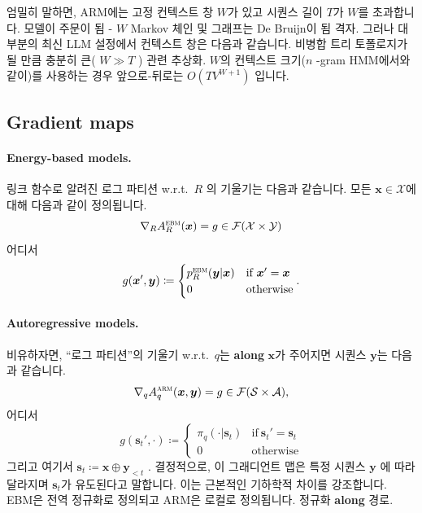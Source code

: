 \documentclass{article}
\def\s{{\bm{s}}}
\def\x{{\bm{x}}}
\def\y{{\bm{y}}}
\def\cA{{\mathcal{A}}}
\def\cF{{\mathcal{F}}}
\def\cS{{\mathcal{S}}}
\def\cX{{\mathcal{X}}}
\def\cY{{\mathcal{Y}}}
\def\arm{{\textsc{arm}}}
\def\ebm{{\textsc{ebm}}}
\def\wrt{{w.r.t.\ }}
\begin{document}
엄밀히 말하면,
ARM에는 고정 컨텍스트 창 $W$가 있고 시퀀스 길이 $T$가 $W$를 초과합니다.
모델이 주문이 됨 - $W$ Markov 체인 및 그래프는 De Bruijn이 됨
격자. 그러나 대부분의 최신 LLM 설정에서 컨텍스트 창은 다음과 같습니다.
비병합 트리 토폴로지가 될 만큼 충분히 큰( $W \gg T$ )
관련 추상화. 
$W$의 컨텍스트 크기($n$ -gram HMM에서와 같이)를 사용하는 경우
앞으로-뒤로는 $O(T V^{W+1})$ 입니다.

\subsection{Gradient maps} 
 \label{sec:gradient_maps}

\paragraph{Energy-based models.}

링크 함수로 알려진 로그 파티션 \wrt $R$ 의 기울기는 다음과 같습니다.
모든 $\x \in \cX$에 대해 다음과 같이 정의됩니다.
 \begin{equation} 
 \nabla _R A^ \ebm _R( \x ) = g \in \cF ( \cX \times \cY )
 \end{equation} 
어디서
 \begin{equation} 
g( \x ', \y ) \coloneqq 
 \begin{cases} 
    p^ \ebm _R( \y | \x ) & \text{if} \ \x ' = \x \\
    0 & \text{otherwise} 
 \end{cases} .
 \end{equation}

\paragraph{Autoregressive models.}

비유하자면, ``로그 파티션''의 기울기 \wrt $q$는 
 \textbf{along} $\x$가 주어지면 시퀀스 $\y$는 다음과 같습니다.
 \begin{equation} 
 \nabla _q A^ \arm _q( \x , \y ) = g \in \cF ( \cS \times \cA ),
 \end{equation} 
어디서
 \begin{equation} 
g( \s _t', \cdot ) \coloneqq \begin{cases} 
     \pi _q( \cdot | \s _t) & \text{if} \ \s _t' = \s _t \\
    0 & \text{otherwise} 
 \end{cases} 
 \end{equation} 
그리고 여기서 $\s_t \coloneqq \x \oplus \y_{<t}$ .
결정적으로, 이 그래디언트 맵은 특정 시퀀스 $\y$ 에 따라 달라지며
$\s_t$가 유도된다고 말합니다.  이는 근본적인 기하학적 차이를 강조합니다.
EBM은 전역 정규화로 정의되고 ARM은 로컬로 정의됩니다.
정규화 \textbf{along} 경로.
\end{document}
